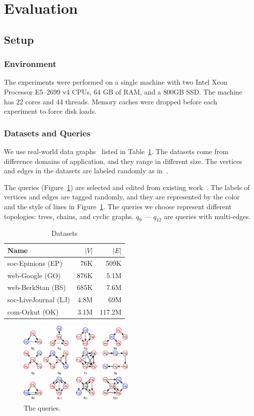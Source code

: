 \section{Evaluation}\label{sec:experiments}
\subsection{Setup}
\subsubsection{Environment}
The experiments were performed on a single machine with two Intel Xeon Processor E5--2699 v4 CPUs, 64 GB of RAM,
and a 800GB SSD\@.
The machine has 22 cores and 44 threads.
Memory caches were dropped before each experiment to force disk loads.
\subsubsection{Datasets and Queries}
We use real-world data graphs~\cite{snapnets} listed in Table~\ref{tab:datasets}.
The datasets come from difference domains of application, and they range in different size.
The vertices and edges in the datasets are labeled randomly as in~\cite{DBLP:journals/pvldb/MhedhbiS19}.

The queries (Figure~\ref{img:queries}) are selected and edited from existing work~\cite{DBLP:conf/cloud/SerafiniMS17,DBLP:journals/pvldb/MhedhbiS19}.
The labels of vertices and edges are tagged randomly,
and they are represented by the color and the style of lines in Figure~\ref{img:queries}.
The queries we choose represent different topologies: trees, chains, and cyclic graphs.
$q_9$ --- $q_{12}$ are queries with multi-edges.
\begin{table}
  \caption{Datasets}\label{tab:datasets}
  \begin{tabular}{lrr}
    \toprule
    Name & $|V|$ & $|E|$ \\
    \midrule
    soc-Epinions (EP) & 76K & 509K \\
    web-Google (GO) & 876K & 5.1M \\
    web-BerkStan (BS) & 685K & 7.6M \\
    soc-LiveJournal (LJ) & 4.8M & 69M \\
    com-Orkut (OK) & 3.1M & 117.2M \\
    \bottomrule
  \end{tabular}
\end{table}

\begin{figure}[ht]
  \centering
  \includegraphics[width=0.5\textwidth]{img/queries.pdf}
  \caption{The queries.}\label{img:queries}
\end{figure}

